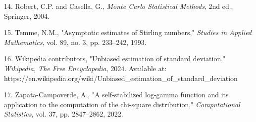 \documentclass[11pt]{article}
\begin{document}
14. Robert, C.P. and Casella, G., \textit{Monte Carlo Statistical Methods}, 2nd ed., Springer, 2004.\par
15. Temme, N.M., "Asymptotic estimates of Stirling numbers," \textit{Studies in Applied Mathematics}, vol. 89, no. 3, pp. 233–242, 1993.\par
16. Wikipedia contributors, "Unbiased estimation of standard deviation," \textit{Wikipedia, The Free Encyclopedia}, 2024. Available at: https://en.wikipedia.org/wiki/Unbiased\_estimation\_of\_standard\_deviation\par
17. Zapata-Campoverde, A., "A self-stabilized log-gamma function and its application to the computation of the chi-square distribution," \textit{Computational Statistics}, vol. 37, pp. 2847–2862, 2022.\par
\endgroup
\end{document}
